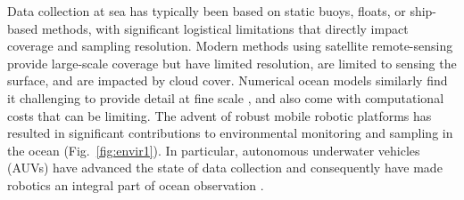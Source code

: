 \documentclass[aoas]{imsart}
\begin{document}
Data collection at sea has typically been based on static buoys,
floats, or ship-based methods, with significant logistical limitations
that directly impact coverage and sampling resolution. Modern methods
using satellite remote-sensing provide large-scale coverage but have
limited resolution, are limited to sensing the surface, and are
impacted by cloud cover. Numerical ocean models similarly find it
challenging to provide detail at fine scale \citep{Lermusiaux:2006},
and also come with computational costs that can be limiting. The
advent of robust mobile robotic platforms \citep{Bellingham07} has
resulted in significant contributions to environmental monitoring and
sampling in the ocean (Fig.~\ref{fig:envir1}). In particular,
autonomous underwater vehicles (AUVs) have advanced the state of data
collection and consequently have made robotics an integral part of
ocean observation \citep{das11b,Das2015,fossuminformation,fossum18b}.
\end{document}
